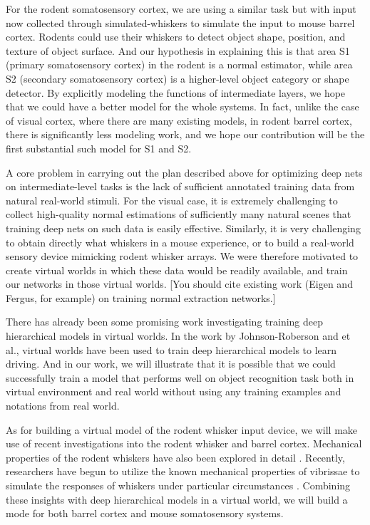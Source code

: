 \documentclass[12pt]{article}
\begin{document}
For the rodent somatosensory cortex, we are using a similar task but with input now collected through simulated-whiskers to simulate the input to mouse barrel cortex. Rodents could use their whiskers to detect object shape, position, and texture of object surface\cite{Boubenec2012,Diamond2008,Arabzadeh2005,OConnor2010}. And our hypothesis in explaining this is that area S1 (primary somatosensory cortex) in the rodent is a normal estimator, while area S2 (secondary somatosensory cortex) is a higher-level object category or shape detector. By explicitly modeling the functions of intermediate layers, we hope that we could have a better model for the whole systems. In fact, unlike the case of visual cortex, where there are many existing models, in rodent barrel cortex, there is significantly less modeling work, and we hope our contribution will be the first substantial such model for S1 and S2.

A core problem in carrying out the plan described above for optimizing deep nets on intermediate-level tasks is the lack of sufficient annotated training data from natural real-world stimuli. For the visual case, it is extremely challenging to collect high-quality normal estimations of sufficiently many natural scenes that training deep nets on such data is easily effective. Similarly, it is very challenging to obtain directly what whiskers in a mouse experience, or to build a real-world sensory device mimicking rodent whisker arrays.  We were therefore motivated to create virtual worlds in which these data would be readily available, and train our networks in those virtual worlds. [You should cite existing work (Eigen and Fergus, for example) on training normal extraction networks.]

There has already been some promising work investigating training deep hierarchical models in virtual worlds\cite{Qiu2016,Johnson-Roberson2016}. In the work by Johnson-Roberson and et al.\cite{Johnson-Roberson2016}, virtual worlds have been used to train deep hierarchical models to learn driving. And in our work, we will illustrate that it is possible that we could successfully train a model that performs well on object recognition task both in virtual environment and real world without using any training examples and notations from real world.

As for building a virtual model of the rodent whisker input device, we will make use of recent investigations into the rodent whisker and barrel cortex\cite{Boubenec2012,Diamond2008,Arabzadeh2005,OConnor2010}. Mechanical properties of the rodent whiskers have also been explored in detail \cite{Diamond2008,Quist2014,Towal2011}. Recently, researchers have begun to utilize the known mechanical properties of vibrissae to simulate the responses of whiskers under particular circumstances \cite{Huet2016}. Combining these insights with deep hierarchical models in a virtual world, we will build a mode for both barrel cortex and mouse somatosensory systems.
\end{document}
